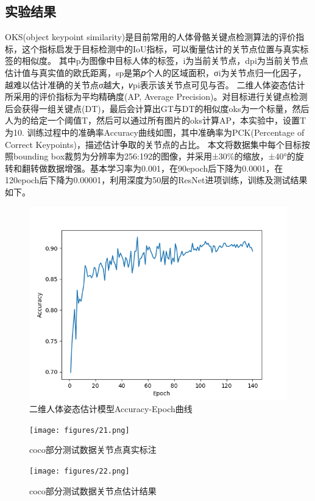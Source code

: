 \subsection{实验结果}{}
OKS(object keypoint similarity)是目前常用的人体骨骼关键点检测算法的评价指标，这个指标启发于目标检测中的IoU指标，可以衡量估计的关节点位置与真实标签的相似度。
其中p为图像中目标人体的标签，i为当前关节点，dpi为当前关节点估计值与真实值的欧氏距离，sp是第𝑝个人的区域面积，σi为关节点归一化因子，越难以估计准确的关节点σ越大，𝑣pi表示该关节点可见与否。
二维人体姿态估计所采用的评价指标为平均精确度(AP, Average Precision)。对目标进行关键点检测后会获得一组关键点(DT)，最后会计算出GT与DT的相似度oks为一个标量，然后人为的给定一个阈值T，然后可以通过所有图片的oks计算AP，本实验中，设置T为10.
训练过程中的准确率Accuracy曲线如图，其中准确率为PCK(Percentage of Correct Keypoints)，描述估计争取的关节点的占比。
本文将数据集中每个目标按照bounding box裁剪为分辨率为256:192的图像，并采用±30\%的缩放，±40°的旋转和翻转做数据增强。基本学习率为0.001，在90epoch后下降为0.0001，在120epoch后下降为0.00001，利用深度为50层的ResNet进项训练，训练及测试结果如下。
\begin{figure}[h]
	\centering
	\includegraphics[scale=0.4]{figures/20.png}
	\caption{二维人体姿态估计模型Accuracy-Epoch曲线}
	\label{fig:f20}
\end{figure}
\begin{figure}[h]
	\centering
	\texttt{[image: figures/21.png]}
	\caption{coco部分测试数据关节点真实标注}
	\label{fig:f21}
\end{figure}
\begin{figure}[h]
	\centering
	\texttt{[image: figures/22.png]}
	\caption{coco部分测试数据关节点估计结果}
	\label{fig:f22}
\end{figure}

